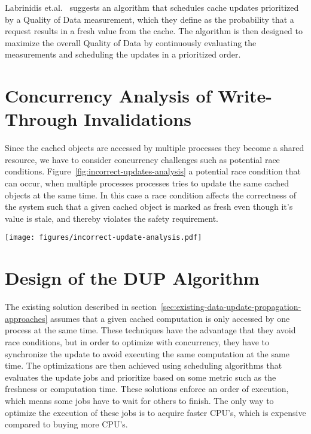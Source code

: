 Labrinidis et.al.~\cite{paper:update-propagation-strategies} suggests an algorithm that schedules cache updates prioritized by a Quality of Data measurement, which they define as the probability that a request results in a fresh value from the cache. The algorithm is then designed to maximize the overall Quality of Data by continuously evaluating the measurements and scheduling the updates in a prioritized order.


\section{Concurrency Analysis of Write-Through Invalidations}
\label{sec:race-condition-on-write-through-invalidation}
Since the cached objects are accessed by multiple processes they become a shared resource, we have to consider concurrency challenges such as potential race conditions. Figure~\ref{fig:incorrect-updates-analysis} a potential race condition that can occur, when multiple processes processes tries to update the same cached objects at the same time. In this case a race condition affects the correctness of the system such that a given cached object is marked as fresh even though it's value is stale, and thereby violates the safety requirement.

\begin{figure*}[ht!]
  \centering
  \texttt{[image: figures/incorrect-update-analysis.pdf]}
  \caption{Showing how two concurrent caching updates from two different application servers results in an inconsistent state. We see that even though the request from \emph{Update Process 2} are based on data older than \emph{Update Process 1} it gets to write.}
  \label{fig:incorrect-updates-analysis}
\end{figure*}


\section{Design of the DUP Algorithm}
\label{sec:the-data-update-propagation-algorithm}
The existing solution described in section~\ref{sec:existing-data-update-propagation-approaches} assumes that a given cached computation is only accessed by one process at the same time. These techniques have the advantage that they avoid race conditions, but in order to optimize with concurrency, they have to synchronize the update to avoid executing the same computation at the same time. The optimizations are then achieved using scheduling algorithms that evaluates the update jobs and prioritize based on some metric such as the freshness or computation time. These solutions enforce an order of execution, which means some jobs have to wait for others to finish. The only way to optimize the execution of these jobs is to acquire faster CPU's, which is expensive compared to buying more CPU's.

